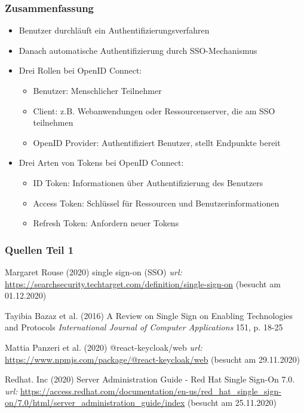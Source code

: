 \documentclass{beamer}
\begin{document}
\begin{frame}
\frametitle{Zusammenfassung}
\begin{itemize}
\item Benutzer durchläuft ein Authentifizierungsverfahren
\item Danach automatische Authentifizierung durch SSO-Mechanismus
\item Drei Rollen bei OpenID Connect:
	\begin{itemize}
	\item Benutzer: Menschlicher Teilnehmer
	\item Client: z.B. Webanwendungen oder Ressourcenserver, die am SSO teilnehmen
	\item OpenID Provider: Authentifiziert Benutzer, stellt Endpunkte bereit
	\end{itemize}
\item Drei Arten von Tokens bei OpenID Connect:
	\begin{itemize}
	\item ID Token: Informationen über Authentifizierung des Benutzers 
	\item Access Token: Schlüssel für Ressourcen und Benutzerinformationen
	\item Refresh Token: Anfordern neuer Tokens
	\end{itemize}
\end{itemize}
\end{frame}

\begin{frame}
\frametitle{Quellen Teil 1}
\footnotesize{
\begin{thebibliography}{99}
 Margaret Rouse (2020)
\newblock single sign-on (SSO)
\newblock \emph{url:} \url{https://searchsecurity.techtarget.com/definition/single-sign-on} (besucht am 01.12.2020)

 Tayibia Bazaz et al. (2016)
\newblock A Review on Single Sign on Enabling Technologies and Protocols
\newblock \emph{International Journal of Computer Applications} 151, p. 18-25

 Mattia Panzeri et al. (2020)
\newblock @react-keycloak/web
\newblock \emph{url:} \url{https://www.npmjs.com/package/@react-keycloak/web} (besucht am 29.11.2020)

 Redhat. Inc (2020)
\newblock Server Administration Guide - Red Hat Single Sign-On 7.0.
\newblock \emph{url:} \url{https://access.redhat.com/documentation/en-us/red_hat_single_sign-on/7.0/html/server_administration_guide/index} (besucht am 25.11.2020)
\end{thebibliography}
}
\end{frame}
\end{document}
